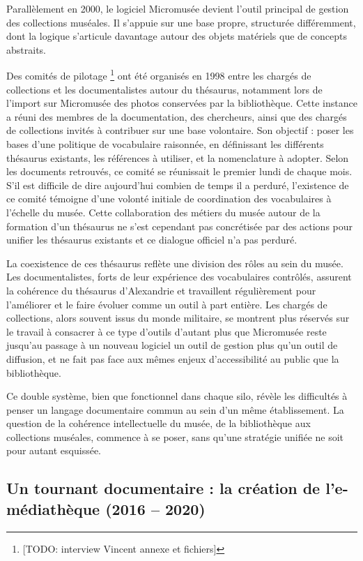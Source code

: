 Parallèlement en 2000, le logiciel Micromusée devient l’outil principal de gestion des collections muséales. Il s’appuie sur une base propre, structurée différemment, dont la logique s’articule davantage autour des objets matériels que de concepts abstraits. 

Des comités de pilotage \footnote{[TODO: interview Vincent annexe et fichiers]}  ont été organisés en 1998 entre les chargés de collections et les documentalistes autour du thésaurus, notamment lors de l'import sur Micromusée des photos conservées par la bibliothèque. Cette instance a réuni des membres de la documentation, des chercheurs, ainsi que des chargés de collections invités à contribuer sur une base volontaire. Son objectif : poser les bases d’une politique de vocabulaire raisonnée, en définissant les différents thésaurus existants, les références à utiliser, et la nomenclature à adopter. Selon les documents retrouvés, ce comité se réunissait le premier lundi de chaque mois. S’il est difficile de dire aujourd’hui combien de temps il a perduré, l'existence de ce comité témoigne d’une volonté initiale de coordination des vocabulaires à l’échelle du musée. Cette collaboration des métiers du musée autour de la formation d'un thésaurus ne s'est cependant pas concrétisée par des actions pour unifier les thésaurus existants et ce dialogue officiel n'a pas perduré.

La coexistence de ces thésaurus reflète une division des rôles au sein du musée. Les documentalistes, forts de leur expérience des vocabulaires contrôlés, assurent la cohérence du thésaurus d'Alexandrie et travaillent régulièrement pour l'améliorer et le faire évoluer comme un outil à part entière. Les chargés de collections, alors souvent issus du monde militaire, se montrent plus réservés sur le travail à consacrer à ce type d'outils d'autant plus que Micromusée reste jusqu'au passage à un nouveau logiciel un outil de gestion plus qu’un outil de diffusion, et ne fait pas face aux mêmes enjeux d'accessibilité au public que la bibliothèque.

Ce double système, bien que fonctionnel dans chaque silo, révèle les difficultés à penser un langage documentaire commun au sein d’un même établissement. La question de la cohérence intellectuelle du musée, de la bibliothèque aux collections muséales, commence à se poser, sans qu'une stratégie unifiée ne soit pour autant esquissée.

\subsection{Un tournant documentaire : la création de l’e-médiathèque (2016 – 2020)}

